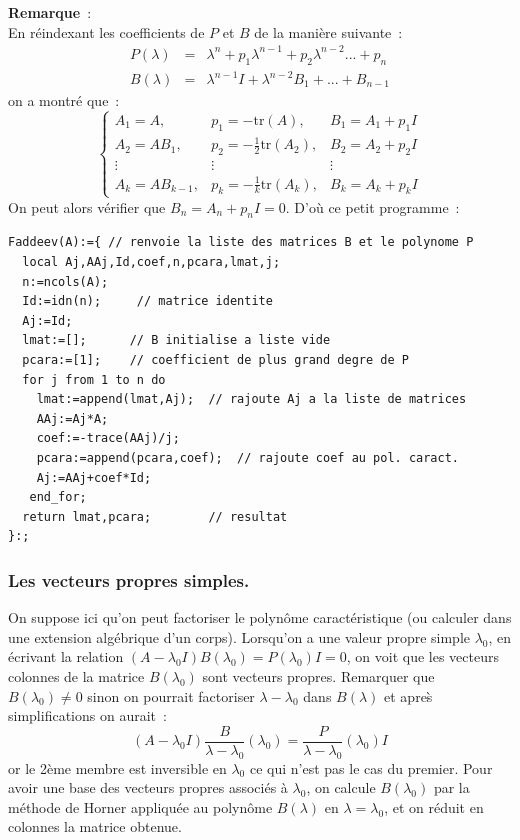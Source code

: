 \documentclass[a4paper,11pt]{article}
\begin{document}
\begin{giacjshere}
{\bf Remarque}~:\\
En réindexant les coefficients de $P$ et $B$ de la manière suivante~:
\begin{eqnarray*}
P(\lambda) &=& \lambda^n+p_1\lambda^{n-1}+p_2\lambda^{n-2}...+p_n \\
B(\lambda) &=& \lambda^{n-1}I+\lambda^{n-2}B_1+...+B_{n-1}
\end{eqnarray*}
on a montré que~:
\[ \left\{
\begin{array}{ccc}
A_1=A, & p_1=-\mbox{tr}(A), & B_1=A_1+p_1I \\  
A_2=AB_1, & p_2=-\frac{1}{2}\mbox{tr}(A_2), & B_2=A_2+p_2I \\ 
\vdots & \vdots & \vdots \\
A_k=AB_{k-1}, & p_k=-\frac{1}{k}\mbox{tr}(A_k), & B_k=A_k+p_kI
\end{array}
\right.\]
On peut alors vérifier que $B_n=A_n+p_nI=0$.
D'où ce petit programme~:
\begin{verbatim}
Faddeev(A):={ // renvoie la liste des matrices B et le polynome P
  local Aj,AAj,Id,coef,n,pcara,lmat,j;
  n:=ncols(A);
  Id:=idn(n);     // matrice identite
  Aj:=Id;
  lmat:=[];      // B initialise a liste vide
  pcara:=[1];    // coefficient de plus grand degre de P
  for j from 1 to n do
    lmat:=append(lmat,Aj);  // rajoute Aj a la liste de matrices
    AAj:=Aj*A;
    coef:=-trace(AAj)/j;    
    pcara:=append(pcara,coef);  // rajoute coef au pol. caract.
    Aj:=AAj+coef*Id;
   end_for;
  return lmat,pcara;        // resultat
}:;
\end{verbatim}

\subsubsection{Les vecteurs propres simples.}
On suppose ici qu'on peut factoriser le polyn\^ome caract\'eristique
(ou calculer dans une extension alg\'ebrique d'un corps).
Lorsqu'on a une valeur propre simple $\lambda_0$, en \'ecrivant
la relation $(A-\lambda_0 I)B(\lambda_0)=P(\lambda_0)I=0$,
on voit que les vecteurs colonnes de la matrice $B(\lambda_0)$
sont vecteurs propres.
Remarquer que $B(\lambda_0) \neq 0$ sinon on pourrait factoriser
$\lambda-\lambda_0$ dans $B(\lambda)$ et apre\`s simplifications on aurait~:
\[(A-\lambda_0 I)\frac{B}{\lambda-\lambda_0}(\lambda_0)=
\frac{P}{\lambda-\lambda_0}(\lambda_0)I \]
or le 2\`eme membre est inversible en $\lambda_0$ ce qui n'est pas le
cas du premier.
Pour avoir une base des vecteurs propres associ\'es \`a $\lambda_0$, on
calcule $B(\lambda_0) $ par la m\'ethode de Horner appliqu\'ee au
polyn\^ome $B(\lambda)$ en $\lambda=\lambda_0$, et on r\'eduit en
colonnes la matrice obtenue.


\end{giacjshere}
\end{document}
